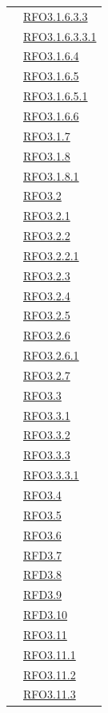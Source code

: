 \begin{longtable}{|>{\centering}m{5cm}|m{5cm}<{\centering}|}
& \hyperlink{RFO3.1.6.3.3}{RFO3.1.6.3.3}\\
& \hyperlink{RFO3.1.6.3.3.1}{RFO3.1.6.3.3.1}\\
& \hyperlink{RFO3.1.6.4}{RFO3.1.6.4}\\
& \hyperlink{RFO3.1.6.5}{RFO3.1.6.5}\\
& \hyperlink{RFO3.1.6.5.1}{RFO3.1.6.5.1}\\
& \hyperlink{RFO3.1.6.6}{RFO3.1.6.6}\\
& \hyperlink{RFO3.1.7}{RFO3.1.7}\\
& \hyperlink{RFO3.1.8}{RFO3.1.8}\\
& \hyperlink{RFO3.1.8.1}{RFO3.1.8.1}\\
& \hyperlink{RFO3.2}{RFO3.2}\\
& \hyperlink{RFO3.2.1}{RFO3.2.1}\\
& \hyperlink{RFO3.2.2}{RFO3.2.2}\\
& \hyperlink{RFO3.2.2.1}{RFO3.2.2.1}\\
& \hyperlink{RFO3.2.3}{RFO3.2.3}\\
& \hyperlink{RFO3.2.4}{RFO3.2.4}\\
& \hyperlink{RFO3.2.5}{RFO3.2.5}\\
& \hyperlink{RFO3.2.6}{RFO3.2.6}\\
& \hyperlink{RFO3.2.6.1}{RFO3.2.6.1}\\
& \hyperlink{RFO3.2.7}{RFO3.2.7}\\
& \hyperlink{RFO3.3}{RFO3.3}\\
& \hyperlink{RFO3.3.1}{RFO3.3.1}\\
& \hyperlink{RFO3.3.2}{RFO3.3.2}\\
& \hyperlink{RFO3.3.3}{RFO3.3.3}\\
& \hyperlink{RFO3.3.3.1}{RFO3.3.3.1}\\
& \hyperlink{RFO3.4}{RFO3.4}\\
& \hyperlink{RFO3.5}{RFO3.5}\\
& \hyperlink{RFO3.6}{RFO3.6}\\
& \hyperlink{RFD3.7}{RFD3.7}\\
& \hyperlink{RFD3.8}{RFD3.8}\\
& \hyperlink{RFD3.9}{RFD3.9}\\
& \hyperlink{RFD3.10}{RFD3.10}\\
& \hyperlink{RFO3.11}{RFO3.11}\\
& \hyperlink{RFO3.11.1}{RFO3.11.1}\\
& \hyperlink{RFO3.11.2}{RFO3.11.2}\\
& \hyperlink{RFO3.11.3}{RFO3.11.3}\\

\end{longtable}
